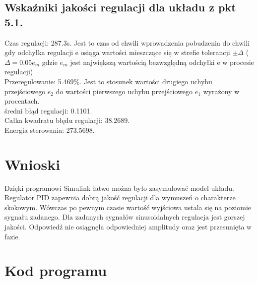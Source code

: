 \documentclass[a4paper]{article}
\begin{document}
\subsection{Wskaźniki jakości regulacji dla układu z pkt 5.1.}
Czas regulacji: 287.3s. Jest to czas od chwili wprowadzenia pobudzenia do chwili gdy odchyłka regulacji e osiąga wartości mieszczące się w strefie tolerancji $\pm\Delta$ ($\Delta=0.05e_m$ gdzie $e_m$ jest największą  wartością bezwzględną odchyłki e w procesie regulacji) \\
Przeregulowanie: 5.469\%. Jest to stosunek wartości drugiego uchybu przejściowego $e_2$ do wartości pierwszego uchybu przejściowego $e_{1}$  wyrażony w procentach.\\
średni błąd regulacji: 0.1101. \\
Całka kwadratu błędu regulacji: 38.2689. \\
Energia sterowania: 273.5698. \\
\section{Wnioski}

Dzięki programowi Simulink łatwo można było zasymulować model układu.
Regulator PID zapewnia dobrą jakość regulacji dla wymuszeń o charakterze skokowym. Wówczas po pewnym czasie wartość wyjściowa ustala się na poziomie sygnału zadanego. 
Dla zadanych sygnałów sinusoidalnych regulacja jest gorszej jakości. Odpowiedź nie osiągnęła odpowiedniej amplitudy oraz jest przesunięta w fazie.

\section{Kod programu}
\end{document}
